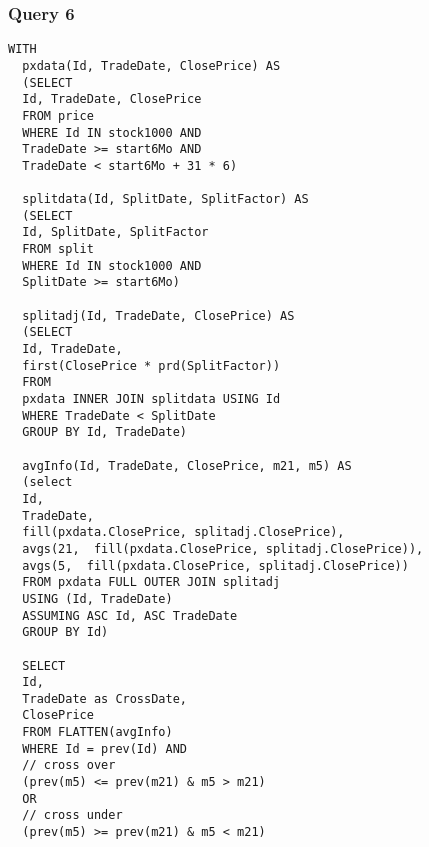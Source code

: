 \documentclass{acm_proc_article-sp}
\begin{document}
\subsubsection{Query 6}
\begin{lstlisting}
WITH
  pxdata(Id, TradeDate, ClosePrice) AS
  (SELECT 
  Id, TradeDate, ClosePrice 
  FROM price 
  WHERE Id IN stock1000 AND 
  TradeDate >= start6Mo AND
  TradeDate < start6Mo + 31 * 6)
 
  splitdata(Id, SplitDate, SplitFactor) AS 
  (SELECT 
  Id, SplitDate, SplitFactor
  FROM split
  WHERE Id IN stock1000 AND 
  SplitDate >= start6Mo)
  
  splitadj(Id, TradeDate, ClosePrice) AS
  (SELECT 
  Id, TradeDate, 
  first(ClosePrice * prd(SplitFactor))
  FROM 
  pxdata INNER JOIN splitdata USING Id 
  WHERE TradeDate < SplitDate
  GROUP BY Id, TradeDate)
      
  avgInfo(Id, TradeDate, ClosePrice, m21, m5) AS 
  (select 
  Id, 
  TradeDate, 
  fill(pxdata.ClosePrice, splitadj.ClosePrice), 
  avgs(21,  fill(pxdata.ClosePrice, splitadj.ClosePrice)),
  avgs(5,  fill(pxdata.ClosePrice, splitadj.ClosePrice))
  FROM pxdata FULL OUTER JOIN splitadj 
  USING (Id, TradeDate)
  ASSUMING ASC Id, ASC TradeDate
  GROUP BY Id)
   
  SELECT 
  Id, 
  TradeDate as CrossDate, 
  ClosePrice
  FROM FLATTEN(avgInfo)
  WHERE Id = prev(Id) AND 
  // cross over
  (prev(m5) <= prev(m21) & m5 > m21)  
  OR 
  // cross under
  (prev(m5) >= prev(m21) & m5 < m21)
\end{lstlisting}
\end{document}
